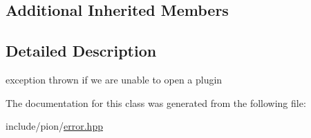 \subsection*{Additional Inherited Members}


\subsection{Detailed Description}
exception thrown if we are unable to open a plugin 

The documentation for this class was generated from the following file\-:\begin{DoxyCompactItemize}
\item 
include/pion/\hyperlink{error_8hpp}{error.\-hpp}\end{DoxyCompactItemize}
